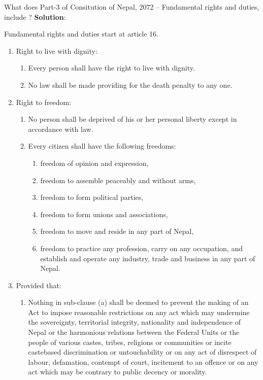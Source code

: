 \documentclass[
  openany]{book}
\newcommand{\question}{\item}
\newenvironment{solution}{ {\bfseries Solution}:}{}
\begin{document}
\begin{questions}

\question What does Part-3 of Consitution of Nepal, 2072 -- Fundamental rights and duties, include ?
\begin{solution}

Fundamental rights and duties start at article 16.

\begin{enumerate}
\addtocounter{enumiii}{16} %
\item Right to live with dignity:
\begin{enumerate}
\item Every person shall have the right to live with dignity.
\item No law shall be made providing for the death penalty to any one.
\end{enumerate}
\item Right to freedom:
\begin{enumerate}
\item No person shall be deprived of his or her personal liberty except in accordance with law.
\item Every citizen shall have the following freedoms:
\begin{enumerate}
\item freedom of opinion and expression,
\item freedom to assemble peaceably and without arms,
\item freedom to form political parties,
\item freedom to form unions and associations,
\item freedom to move and reside in any part of Nepal,
\item freedom to practice any profession, carry on any occupation, and establish and operate any industry, trade and business in any part of Nepal.
\end{enumerate}
\end{enumerate}
\item[] Provided that:
\begin{enumerate}
\item Nothing in sub-clause (a) shall be deemed to prevent the making of an Act to impose reasonable restrictions on any act which may undermine the sovereignty, territorial integrity, nationality and independence of Nepal or the harmonious relations between the Federal Units or the people of various castes, tribes, religions or communities or incite castebased discrimination or untouchability or on any act of disrespect of labour, defamation, contempt of court, incitement to an offence or on any act which may be contrary to public decency or morality.

\end{enumerate}
\end{enumerate}
\end{solution}
\end{questions}
\end{document}
